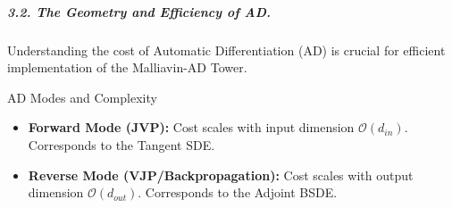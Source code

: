 \documentclass[11pt,letterpaper,oneside]{article}
\theoremstyle{plain}
\theoremstyle{definition}
\theoremstyle{remark}
\begin{document}
\begin{figure}[ht]
\captionsetup{hypcap=false}
    \label{fig:QMC_Convergence_R3}
\end{figure}

\subparagraph{3.2. The Geometry and Efficiency of AD.}
Understanding the cost of Automatic Differentiation (AD) is crucial for efficient implementation of the Malliavin-AD Tower.

\begin{distilldef}{AD Modes and Complexity}
\begin{itemize}
    \item \textbf{Forward Mode (JVP):} Cost scales with input dimension $\mathcal{O}(d_{in})$. Corresponds to the Tangent SDE.
    \item \textbf{Reverse Mode (VJP/Backpropagation):} Cost scales with output dimension $\mathcal{O}(d_{out})$. Corresponds to the Adjoint BSDE.
\end{itemize}
\end{distilldef}
\end{document}
